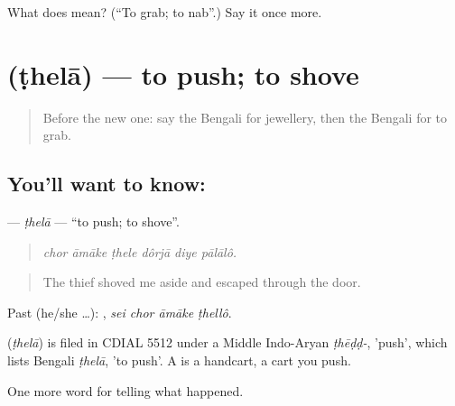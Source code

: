 \begin{tcolorbox}[breakable,colback=teal!4,colframe=teal!35!black,title={Before you move on}]
What does  mean? (\textquotedblleft{}To grab; to nab\textquotedblright{}.) Say it once more.
\end{tcolorbox}
\section[\texorpdfstring{\bn{ঠেলা} (ṭhelā)}{ঠেলা (ṭhelā)}]{ (ṭhelā) — to push; to shove}

\label{lesson:BN-C282-thela}



\begin{quote}
Before the new one: say the Bengali for jewellery, then the Bengali for to grab.
\end{quote}

\subsection*{You'll want to know: }
\textbf{} — \emph{ṭhelā} — \textquotedblleft{}to push; to shove\textquotedblright{}.

\begin{quote}
     
\end{quote}

\begin{quote}
\emph{chor āmāke ṭhele dôrjā diye pālālô.}
\end{quote}

\begin{quote}
The thief shoved me aside and escaped through the door.
\end{quote}

Past (he/she …):    , \emph{sei chor āmāke ṭhellô}.

\begin{cousinweb}
\textbf{} (\emph{ṭhelā}) is filed in CDIAL 5512 under a Middle Indo-Aryan \emph{ṭhēḍḍ-}, 'push', which lists Bengali \emph{ṭhelā}, 'to push'. A  is a handcart, a cart you push.
\end{cousinweb}

\begin{grammarlens}[title={What you've built}]
One more word for telling what happened.
\end{grammarlens}

